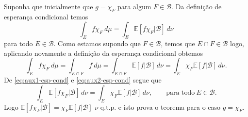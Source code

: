 Suponha que inicialmente que $g=\chi_{F}$ para algum $F\in\mathcal{B}$. Da definição de esperança condicional temos  
\begin{equation}\label{eq:aux1-esp-cond}
\int_{E} f\chi_{F}\ d\mu=\int_{E}\mathbb{E}[f\chi_{F}|\mathcal{B}]\, d\nu	
\end{equation}
para todo $E\in\mathcal{B}$. Como estamos supondo que $F\in\mathcal{B}$, temos que $E\cap F\in\mathcal{B}$ 
logo, aplicando novamente a definição da esperança condicional obtemos  
\begin{equation}
\label{eq:aux2-esp-cond}
\int_{E} f\chi_{F}\ d\mu=\int_{E\cap F} f\ d\mu=\int_{E\cap F}\mathbb{E}[f|\mathcal{B}]\, d\nu
=\int_{E}\chi_{F}\mathbb{E}[f|\mathcal{B}]\, d\nu.
\end{equation}
De \eqref{eq:aux1-esp-cond} e \eqref{eq:aux2-esp-cond} segue que 
$$
\int_{E}\mathbb{E}[f\chi_{F}|\mathcal{B}]\, d\nu=\int_{E}\chi_{F}\mathbb{E}[f|\mathcal{B}]\, d\nu,
\qquad \text{para todo}\ E\in\mathcal{B}.
$$
Logo $\mathbb{E}[f\chi_{F}|\mathcal{B}]=\chi_{F}\mathbb{E}[f|\mathcal{B}]$ $\nu$-q.t.p. e isto prova o teorema 
para o caso $g=\chi_{F}$. 

